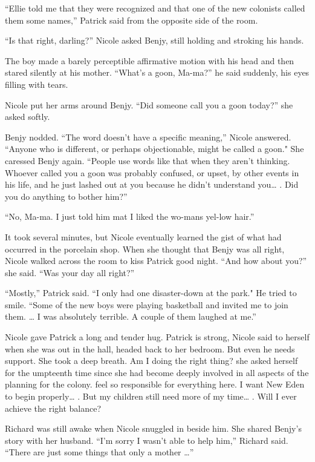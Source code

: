 \documentclass[]{article}
\begin{document}
{“Ellie told me that they were recognized and that one of the new colonists called them some names,” Patrick said from the opposite side of the room.

“Is that right, darling?” Nicole asked Benjy, still holding and stroking his hands.

The boy made a barely perceptible affirmative motion with his head and then stared silently at his mother.  “What’s a goon, Ma-ma?” he said suddenly, his eyes filling with tears.

Nicole put her arms around Benjy.  “Did someone call you a goon today?” she asked softly.

Benjy nodded.  “The word doesn’t have a specific meaning,” Nicole answered.  “Anyone who is different, or perhaps objectionable, might be called a goon."  She caressed Benjy again.  “People use words like that when they aren’t thinking.  Whoever called you a goon was probably confused, or upset, by other events in his life, and he just lashed out at you because he didn’t understand you… .  Did you do anything to bother him?”

“No, Ma-ma.  I just told him mat I liked the wo-mans yel-low hair.”

It took several minutes, but Nicole eventually learned the gist of what had occurred in the porcelain shop.  When she thought that Benjy was all right, Nicole walked across the room to kiss Patrick good night.  “And how about you?” she said.  “Was your day all right?”

“Mostly,” Patrick said.  “I only had one disaster-down at the park."  He tried to smile.  “Some of the new boys were playing basketball and invited me to join them.  … I was absolutely terrible.  A couple of them laughed at me.”

Nicole gave Patrick a long and tender hug.  Patrick is strong, Nicole said to herself when she was out in the hall, headed back to her bedroom.  But even he needs support.  She took a deep breath.  Am I doing the right thing? she asked herself for the umpteenth time since she had become deeply involved in all aspects of the planning for the colony.  feel so responsible for everything here.  I want New Eden to begin properly… .  But my children still need more of my time… .  Will I ever achieve the right balance?

Richard was still awake when Nicole snuggled in beside him.  She shared Benjy’s story with her husband.  “I’m sorry I wasn’t able to help him,” Richard said.  “There are just some things that only a mother …”

}
\end{document}

